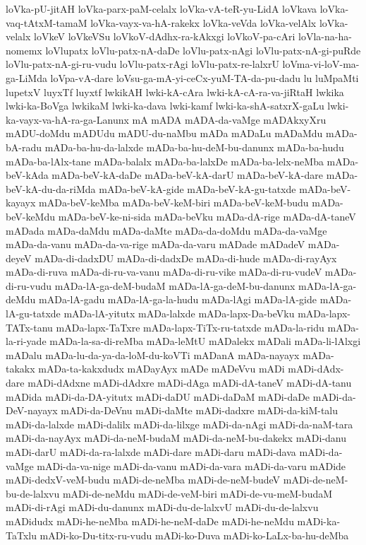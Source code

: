 {loVka-pU-jitAH
loVka-parx-paM-celalx
loVka-vA-teR-yu-LidA
loVkava
loVka-vaq-tAtxM-tamaM
loVka-vayx-va-hA-rakekx
loVka-veVda
loVka-velAlx
loVka-velalx
loVkeV
loVkeVSu
loVkoV-dAdhx-ra-kAkxgi
loVkoV-pa-cAri
loVla-na-ha-nomemx
loVlupatx
loVlu-patx-nA-daDe
loVlu-patx-nAgi
loVlu-patx-nA-gi-puRde
loVlu-patx-nA-gi-ru-vudu
loVlu-patx-rAgi
loVlu-patx-re-lalxrU
loVma-vi-loV-ma-ga-LiMda
loVpa-vA-dare
loVsu-ga-mA-yi-ceCx-yuM-TA-da-pu-dadu
lu
luMpaMti
lupetxV
luyxTf
luyxtf
lwkikAH
lwki-kA-cAra
lwki-kA-cA-ra-va-jiRtaH
lwkika
lwki-ka-BoVga
lwkikaM
lwki-ka-dava
lwki-kamf
lwki-ka-shA-satxrX-gaLu
lwki-ka-vayx-va-hA-ra-ga-Lanunx
mA
mADA
mADA-da-vaMge
mADAkxyXru
mADU-doMdu
mADUdu
mADU-du-naMbu
mADa
mADaLu
mADaMdu
mADa-bA-radu
mADa-ba-hu-da-lalxde
mADa-ba-hu-deM-bu-danunx
mADa-ba-hudu
mADa-ba-lAlx-tane
mADa-balalx
mADa-ba-lalxDe
mADa-ba-lelx-neMba
mADa-beV-kAda
mADa-beV-kA-daDe
mADa-beV-kA-darU
mADa-beV-kA-dare
mADa-beV-kA-du-da-riMda
mADa-beV-kA-gide
mADa-beV-kA-gu-tatxde
mADa-beV-kayayx
mADa-beV-keMba
mADa-beV-keM-biri
mADa-beV-keM-budu
mADa-beV-keMdu
mADa-beV-ke-ni-sida
mADa-beVku
mADa-dA-rige
mADa-dA-taneV
mADada
mADa-daMdu
mADa-daMte
mADa-da-doMdu
mADa-da-vaMge
mADa-da-vanu
mADa-da-va-rige
mADa-da-varu
mADade
mADadeV
mADa-deyeV
mADa-di-dadxDU
mADa-di-dadxDe
mADa-di-hude
mADa-di-rayAyx
mADa-di-ruva
mADa-di-ru-va-vanu
mADa-di-ru-vike
mADa-di-ru-vudeV
mADa-di-ru-vudu
mADa-lA-ga-deM-budaM
mADa-lA-ga-deM-bu-danunx
mADa-lA-ga-deMdu
mADa-lA-gadu
mADa-lA-ga-la-hudu
mADa-lAgi
mADa-lA-gide
mADa-lA-gu-tatxde
mADa-lA-yitutx
mADa-lalxde
mADa-lapx-Da-beVku
mADa-lapx-TATx-tanu
mADa-lapx-TaTxre
mADa-lapx-TiTx-ru-tatxde
mADa-la-ridu
mADa-la-ri-yade
mADa-la-sa-di-reMba
mADa-leMtU
mADalekx
mADali
mADa-li-lAlxgi
mADalu
mADa-lu-da-ya-da-loM-du-koVTi
mADanA
mADa-nayayx
mADa-takakx
mADa-ta-kakxdudx
mADayAyx
mADe
mADeVvu
mADi
mADi-dAdx-dare
mADi-dAdxne
mADi-dAdxre
mADi-dAga
mADi-dA-taneV
mADi-dA-tanu
mADida
mADi-da-DA-yitutx
mADi-daDU
mADi-daDaM
mADi-daDe
mADi-da-DeV-nayayx
mADi-da-DeVnu
mADi-daMte
mADi-dadxre
mADi-da-kiM-talu
mADi-da-lalxde
mADi-dalilx
mADi-da-lilxge
mADi-da-nAgi
mADi-da-naM-tara
mADi-da-nayAyx
mADi-da-neM-budaM
mADi-da-neM-bu-dakekx
mADi-danu
mADi-darU
mADi-da-ra-lalxde
mADi-dare
mADi-daru
mADi-dava
mADi-da-vaMge
mADi-da-va-nige
mADi-da-vanu
mADi-da-vara
mADi-da-varu
mADide
mADi-dedxV-veM-budu
mADi-de-neMba
mADi-de-neM-budeV
mADi-de-neM-bu-de-lalxvu
mADi-de-neMdu
mADi-de-veM-biri
mADi-de-vu-meM-budaM
mADi-di-rAgi
mADi-du-danunx
mADi-du-de-lalxvU
mADi-du-de-lalxvu
mADidudx
mADi-he-neMba
mADi-he-neM-daDe
mADi-he-neMdu
mADi-ka-TaTxlu
mADi-ko-Du-titx-ru-vudu
mADi-ko-Duva
mADi-ko-LaLx-ba-hu-deMba
}
